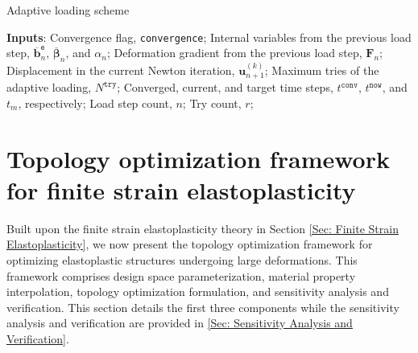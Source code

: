 \documentclass[preprint,11pt]{elsarticle}
\theoremstyle{definition}
\begin{document}
\begin{algorithm}[!htbp]
\caption{Adaptive loading scheme}
\label{Algorithm of Adaptive Loading}

\textbf{Inputs}: Convergence flag, \texttt{convergence};
Internal variables from the previous load step, $\overline{\mathbf{b}}_n^\texttt{e}$, $\overline{\boldsymbol{\beta}}_n$, and $\alpha_n$;
Deformation gradient from the previous load step, $\mathbf{F}_n$;
Displacement in the current Newton iteration, $\mathbf{u}_{n+1}^{(k)}$;
Maximum tries of the adaptive loading, $N^\texttt{try}$;
Converged, current, and target time steps, $t^\texttt{conv}$, $t^\texttt{now}$, and $t_m$, respectively;
Load step count, $n$;
Try count, $r$;

\end{algorithm}


\section{Topology optimization framework for finite strain elastoplasticity}
\label{Sec: Topology Optimization Framework}

Built upon the finite strain elastoplasticity theory in Section \ref{Sec: Finite Strain Elastoplasticity}, we now present the topology optimization framework for optimizing elastoplastic structures undergoing large deformations. This framework comprises design space parameterization, material property interpolation, topology optimization formulation, and sensitivity analysis and verification. This section details the first three components while the sensitivity analysis and verification are provided in \ref{Sec: Sensitivity Analysis and Verification}.
\end{document}
